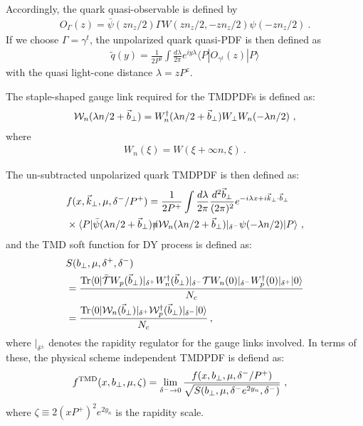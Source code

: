 \documentclass[aps,rmp,reprint,amsmath,amssymb,graphicx,longbibliography]{revtex4-1} %
\begin{document}
Accordingly, the quark quasi-observable is defined by
\begin{align}
{O}_\Gamma(z )=\bar\psi(zn_z/2)\Gamma W(zn_z/2,-zn_z/2)\psi(-zn_z/2) \ .
\end{align}
If we choose $\Gamma=\gamma^t$, the unpolarized quark quasi-PDF is then defined as
\begin{align}
{\tilde q}(y)=\frac{1}{2P^0}\int\frac{d\lambda }{2\pi}e^{iy \lambda}\langle P|{O}_{\gamma^t}(z )|P\rangle
\end{align}
with the quasi light-cone distance $\lambda =z P^z$.

The staple-shaped gauge link required for the TMDPDFs is defined as:
\begin{align}
{\cal W}_n(\lambda n/2+\vec{b}_\perp)=W^{\dagger}_n(\lambda n/2+\vec{b}_\perp)W_\perp W_n(-\lambda n/2) \ ,
\end{align}
where
\begin{align}
W_n(\xi)=W(\xi+\infty n,\xi) \ .
\end{align}

The un-subtracted unpolarized quark TMDPDF is then defined as:
\begin{align}
& f(x,\vec{k}_\perp,\mu,\delta^-/P^+) = \frac{1}{2P^+}\int\frac{d\lambda}{2\pi}\frac{d^2\vec{b}_\perp}{(2\pi)^2}
 e^{-i\lambda x+i\vec{k}_\perp \cdot \vec{b}_\perp}\nonumber \\
& \times \langle P| \bar \psi(\lambda n/2 +\vec{b}_\perp)\slashed{n}{\cal W}_n(\lambda n/2+\vec{b}_\perp)|_{\delta^-}\psi(-\lambda n/2)|P\rangle  \ ,
\end{align}
and the TMD soft function for DY process is defined as:
\begin{align}
& S(b_\perp,\mu,\delta^+,\delta^-)\nonumber \\
&=\frac{{\rm Tr}\langle 0|{\cal \bar T}W_p(\vec{b}_\perp)|_{\delta^+}W_n^{\dagger}(\vec{b}_\perp)|_{\delta^-}{\cal T} W_n(0)|_{\delta^-}W^{\dagger}_p(0)|_{\delta^+}|0\rangle }{N_c} \nonumber \\
&=\frac{{\rm Tr}\langle 0|{\cal W}_{n}(\vec{b}_\perp)|_{\delta^+} {\cal W}^{\dagger}_{p}(\vec{b}_\perp)|_{\delta^-}|0\rangle}{N_c} \,,
\end{align}
where $|_{\delta^{\pm}}$ denotes the rapidity regulator for the gauge links involved. In terms of these, the physical scheme independent TMDPDF is defiend as:
\begin{align}
&f^{\rm TMD}(x,b_\perp,\mu,\zeta)=\lim_{\delta^- \rightarrow 0}\frac{f(x,b_\perp,\mu,\delta^-/P^+)}{\sqrt{S(b_\perp,\mu,\delta^- e^{2y_n},\delta^-)}} \ ,
\end{align}
where $\zeta \equiv 2(xP^+)^2e^{2y_n}$ is the rapidity scale.
\end{document}
